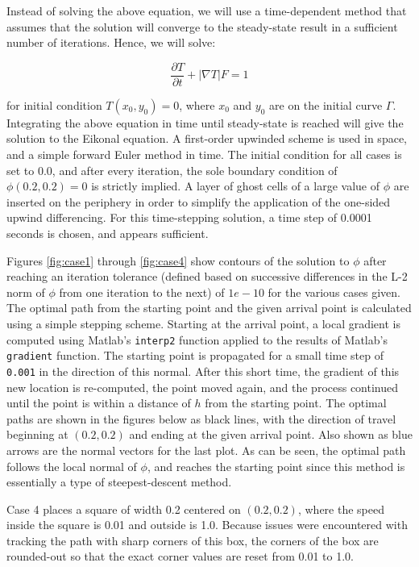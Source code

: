 \documentclass[10pt]{article}
\newcommand{\beq}{\begin{equation}}
\newcommand{\eeq}{\end{equation}}
\begin{document}
Instead of solving the above equation, we will use a time-dependent method that assumes that the solution will converge to the steady-state result in a sufficient number of iterations. Hence, we will solve:

\beq
\frac{\partial T}{\partial t}+|\nabla T|F=1
\eeq

for initial condition \(T(x_0, y_0)=0\), where \(x_0\) and \(y_0\) are on the initial curve \(\Gamma\). Integrating the above equation in time until steady-state is reached will give the solution to the Eikonal equation. A first-order upwinded scheme is used in space, and a simple forward Euler method in time. The initial condition for all cases is set to 0.0, and after every iteration, the sole boundary condition of \(\phi(0.2, 0.2)=0\) is strictly implied. A layer of ghost cells of a large value of \(\phi\) are inserted on the periphery in order to simplify the application of the one-sided upwind differencing. For this time-stepping solution, a time step of 0.0001 seconds is chosen, and appears sufficient.

Figures \ref{fig:case1} through \ref{fig:case4} show contours of the solution to \(\phi\) after reaching an iteration tolerance (defined based on successive differences in the L-2 norm of \(\phi\) from one iteration to the next) of \(1e-10\) for the various cases given. The optimal path from the starting point and the given arrival point is calculated using a simple stepping scheme. Starting at the arrival point, a local gradient is computed using Matlab's {\tt interp2} function applied to the results of Matlab's {\tt gradient} function. The starting point is propagated for a small time step of {\tt 0.001} in the direction of this normal. After this short time, the gradient of this new location is re-computed, the point moved again, and the process continued until the point is within a distance of \(h\) from the starting point. The optimal paths are shown in the figures below as black lines, with the direction of travel beginning at \((0.2, 0.2)\) and ending at the given arrival point. Also shown as blue arrows are the normal vectors for the last plot. As can be seen, the optimal path follows the local normal of \(\phi\), and reaches the starting point since this method is essentially a type of steepest-descent method. 

Case 4 places a square of width 0.2 centered on \((0.2, 0.2)\), where the speed inside the square is 0.01 and outside is 1.0. Because issues were encountered with tracking the path with sharp corners of this box, the corners of the box are rounded-out so that the exact corner values are reset from 0.01 to 1.0.
\end{document}
